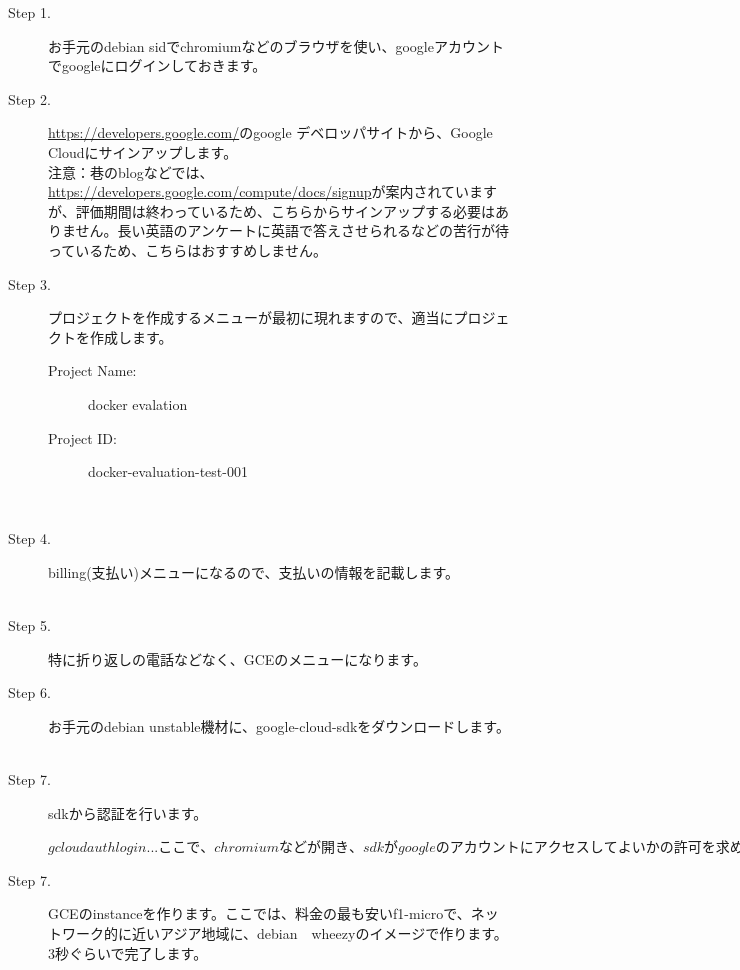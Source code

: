 \documentclass[mingoth,a4paper]{jsarticle}
\begin{document}
\begin{description}
 \item [Step 1.] お手元のdebian sidでchromiumなどのブラウザを使い、googleアカウントでgoogleにログインしておきます。
 \item [Step 2.] \url{https://developers.google.com/}のgoogle デベロッパサイトから、Google Cloudにサインアップします。\\
注意：巷のblogなどでは、\url{https://developers.google.com/compute/docs/signup}が案内されていますが、評価期間は終わっているため、こちらからサインアップする必要はありません。長い英語のアンケートに英語で答えさせられるなどの苦行が待っているため、こちらはおすすめしません。
 \item [Step 3.] プロジェクトを作成するメニューが最初に現れますので、適当にプロジェクトを作成します。
　　\begin{description} 
     \item [Project Name:] docker evalation
     \item [Project ID:] docker-evaluation-test-001
   \end{description}
　　　\item [Step 4.] billing(支払い)メニューになるので、支払いの情報を記載します。
　　　　\item [Step 5.] 特に折り返しの電話などなく、GCEのメニューになります。
　　　\item [Step 6.] お手元のdebian unstable機材に、google-cloud-sdkをダウンロードします。
    \item [Step 7.] sdkから認証を行います。
  \begin{commandline}
$ gcloud auth login
...ここで、chromiumなどが開き、sdkがgoogleのアカウントにアクセスしてよいかの
　　許可を求められるので、「承諾」を押下...
$ 
  \end{commandline}
    \item [Step 7.] GCEのinstanceを作ります。ここでは、料金の最も安いf1-microで、ネットワーク的に近いアジア地域に、debian　wheezyのイメージで作ります。3秒ぐらいで完了します。
  \begin{commandline}

\end{commandline}
\end{description}
\end{document}
